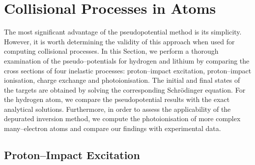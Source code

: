 \documentclass[10pt]{article}
\begin{document}
\section{Collisional Processes in Atoms}
\label{sec:colproc}

The most significant advantage of the pseudopotential method is its 
simplicity. However, it is worth determining the validity of this 
approach when used for computing collisional processes. In this 
Section, we perform a thorough examination of the pseudo--potentials 
for hydrogen and lithium by comparing the cross sections of four 
inelastic processes: proton--impact excitation, proton--impact 
ionisation, charge exchange and photoionisation. The initial and 
final states of the targets are obtained by solving the corresponding 
Schr\"odinger equation. For the hydrogen atom, we compare the 
pseudopotential results with the exact analytical solutions. 
Furthermore, in order to assess the applicability of the depurated 
inversion method, we compute the photoionisation of more complex 
many--electron atoms and compare our findings with experimental data.


\subsection{Proton--Impact Excitation}
\end{document}
